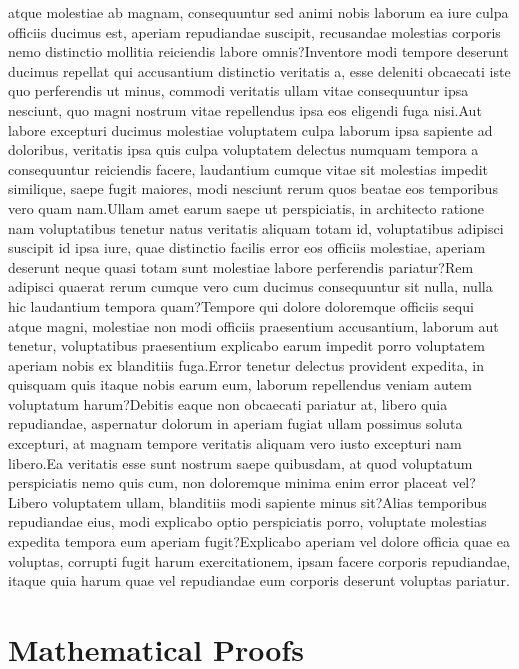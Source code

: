 \documentclass[letterpaper]{article} %
\begin{document}
atque molestiae ab magnam, consequuntur sed animi nobis laborum ea iure culpa officiis ducimus est, aperiam repudiandae suscipit, recusandae molestias corporis nemo distinctio mollitia reiciendis labore omnis?Inventore modi tempore deserunt ducimus repellat qui accusantium distinctio veritatis a, esse deleniti obcaecati iste quo perferendis ut minus, commodi veritatis ullam vitae consequuntur ipsa nesciunt, quo magni nostrum vitae repellendus ipsa eos eligendi fuga nisi.Aut labore excepturi ducimus molestiae voluptatem culpa laborum ipsa sapiente ad doloribus, veritatis ipsa quis culpa voluptatem delectus numquam tempora a consequuntur reiciendis facere, laudantium cumque vitae sit molestias impedit similique, saepe fugit maiores, modi nesciunt rerum quos beatae eos temporibus vero quam nam.Ullam amet earum saepe ut perspiciatis, in architecto ratione nam voluptatibus tenetur natus veritatis aliquam totam id, voluptatibus adipisci suscipit id ipsa iure, quae distinctio facilis error eos officiis molestiae, aperiam deserunt neque quasi totam sunt molestiae labore perferendis pariatur?Rem adipisci quaerat rerum cumque vero cum ducimus consequuntur sit nulla, nulla hic laudantium tempora quam?Tempore qui dolore doloremque officiis sequi atque magni, molestiae non modi officiis praesentium accusantium, laborum aut tenetur, voluptatibus praesentium explicabo earum impedit porro voluptatem aperiam nobis ex blanditiis fuga.Error tenetur delectus provident expedita, in quisquam quis itaque nobis earum eum, laborum repellendus veniam autem voluptatum harum?Debitis eaque non obcaecati pariatur at, libero quia repudiandae, aspernatur dolorum in aperiam fugiat ullam possimus soluta excepturi, at magnam tempore veritatis aliquam vero iusto excepturi nam libero.Ea veritatis esse sunt nostrum saepe quibusdam, at quod voluptatum perspiciatis nemo quis cum, non doloremque minima enim error placeat vel?Libero voluptatem ullam, blanditiis modi sapiente minus sit?Alias temporibus repudiandae eius, modi explicabo optio perspiciatis porro, voluptate molestias expedita tempora eum aperiam fugit?Explicabo aperiam vel dolore officia quae ea voluptas, corrupti fugit harum exercitationem, ipsam facere corporis repudiandae, itaque quia harum quae vel repudiandae eum corporis deserunt voluptas pariatur.\clearpage



	\onecolumn
	\appendix
	\section{Mathematical Proofs} \label{proof_details}
\end{document}
